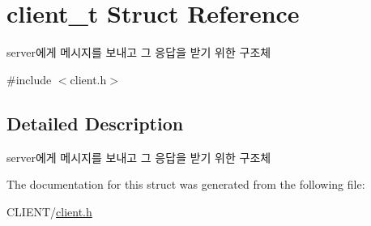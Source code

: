 \hypertarget{structclient__t}{\section{client\-\_\-t Struct Reference}
\label{structclient__t}
}


server에게 메시지를 보내고 그 응답을 받기 위한 구조체  




{\ttfamily \#include $<$client.\-h$>$}



\subsection{Detailed Description}
server에게 메시지를 보내고 그 응답을 받기 위한 구조체 

The documentation for this struct was generated from the following file\-:\begin{DoxyCompactItemize}
\item 
C\-L\-I\-E\-N\-T/\hyperlink{client_8h}{client.\-h}\end{DoxyCompactItemize}
